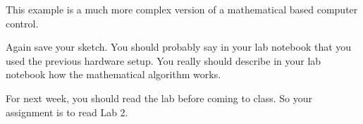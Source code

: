 This example is a much more complex version of a mathematical based computer
control.

% 
% 
% 
% 

Again save your sketch. You should probably say in your lab notebook that
you used the previous hardware setup. You really should describe in your lab
notebook how the mathematical algorithm works.

For next week, you should read the lab before coming to class. So your
assignment is to read Lab 2.

\vspace*{\fill}%
\pagebreak
